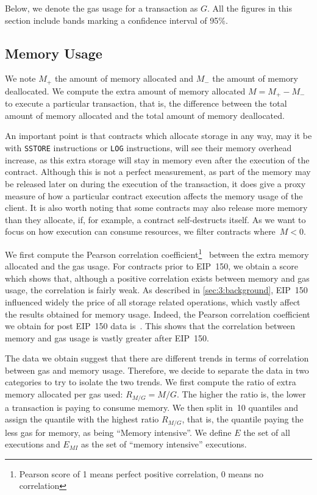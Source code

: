 Below, we denote the gas usage for a transaction as $G$. All the figures in this section include bands marking a confidence interval of 95\%.

\subsection{Memory Usage}
We note $M_{+}$ the amount of memory allocated and $M_{-}$ the amount of memory deallocated. We compute the extra amount of memory allocated $M = M_{+} - M_{-}$ to execute a particular transaction, that is, the difference between the total amount of memory allocated and the total amount of memory deallocated.

An important point is that contracts which allocate storage in any way, may it be with \lstinline{SSTORE} instructions or \lstinline{LOG} instructions, will see their memory overhead increase, as this extra storage will stay in memory even after the execution of the contract. Although this is not a perfect measurement, as part of the memory may be released later on during the execution of the transaction, it does give a proxy measure of how a particular contract execution affects the memory usage of the client. It is also worth noting that some contracts may also release more memory than they allocate, if, for example, a contract self-destructs itself. As we want to focus on how execution can consume resources, we filter contracts where~$M < 0$.

We first compute the Pearson correlation coefficient\footnote{Pearson score of 1 means perfect positive correlation, 0 means no correlation}~\cite{boslaugh2012statistics} between the extra memory allocated and the gas usage. For contracts prior to  EIP~150, we obtain a score  which shows that, although a positive correlation exists between memory and gas usage, the correlation is fairly weak. As described in \autoref{sec:3:background}, EIP~150 influenced widely the price of all storage related operations, which vastly affect the results obtained for memory usage. Indeed, the Pearson correlation coefficient we obtain for post EIP~150 data is~. This shows that the correlation between memory and gas usage is vastly greater after EIP~150.

The data we obtain suggest that there are different trends in terms of correlation between gas and memory usage. Therefore, we decide to separate the data in two categories to try to isolate the two trends. We first compute the ratio of extra memory allocated per gas used: $R_{M/G} = M / G$. The higher the ratio is, the lower a transaction is paying to consume memory. We then split in~10 quantiles and assign the quantile with the highest ratio $R_{M/G}$, that is, the quantile paying the less gas for memory, as being ``Memory intensive''. We define $E$ the set of all executions and $E_{MI}$ as the set of ``memory intensive'' executions.

